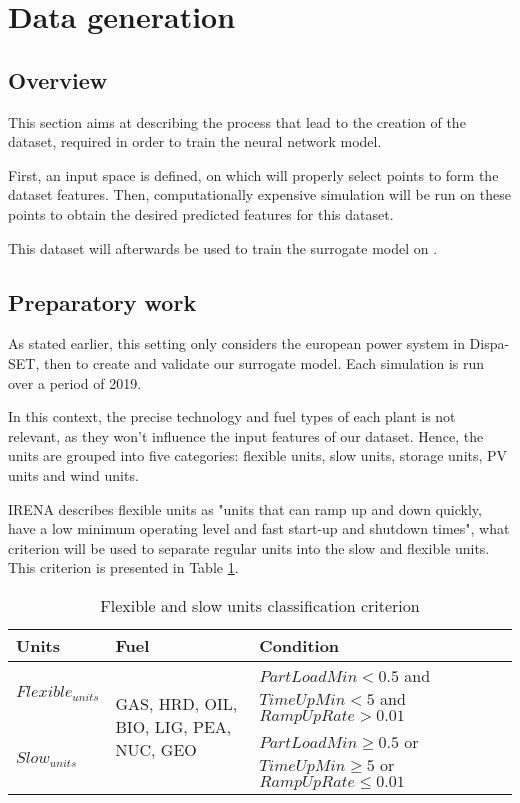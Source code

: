 \section{Data generation}

\subsection{Overview}

This section aims at describing the process that lead to the creation of the dataset, required in order to train the neural network model.

First, an input space is defined, on which will properly select points to form the dataset features. Then, computationally expensive simulation will be run on these points to obtain the desired predicted features for this dataset.

This dataset will afterwards be used to train the surrogate model on \cite{surrogate_model}.

\subsection{Preparatory work}

As stated earlier, this setting only considers the european power system in Dispa-SET, then to create and validate our surrogate model. Each simulation is run over a period of 2019.

In this context, the precise technology and fuel types of each plant is not relevant, as they won't influence the input features of our dataset. Hence, the units are grouped into five categories: flexible units, slow units, storage units, PV units and wind units.

IRENA \cite{irena} describes flexible units as "units that can ramp up and down quickly, have a low minimum operating level and fast start-up and shutdown times", what criterion will be used to separate regular units into the slow and flexible units. This criterion is presented in Table \ref{table:flex-vs-slow-unit}.

\begin{table}[h!]
    \centering
	\begin{tabular}{|l | l | p{8cm}|}
		\hline
		Units & Fuel & Condition \\
		\hline
		$Flexible_{units}$ & \multirow{2}{3cm}{GAS, HRD, OIL, BIO, LIG, PEA, NUC, GEO} & $PartLoadMin<0.5$ and $TimeUpMin<5$ and $RampUpRate>0.01$\\ \cline{1-1} \cline{3-3}
		$Slow_{units}$ &  & $PartLoadMin\geq 0.5$ or $TimeUpMin \geq 5$ or $RampUpRate\leq 0.01$\\
		\hline
	\end{tabular}
	\caption{Flexible and slow units classification criterion}
	\label{table:flex-vs-slow-unit}
\end{table}

